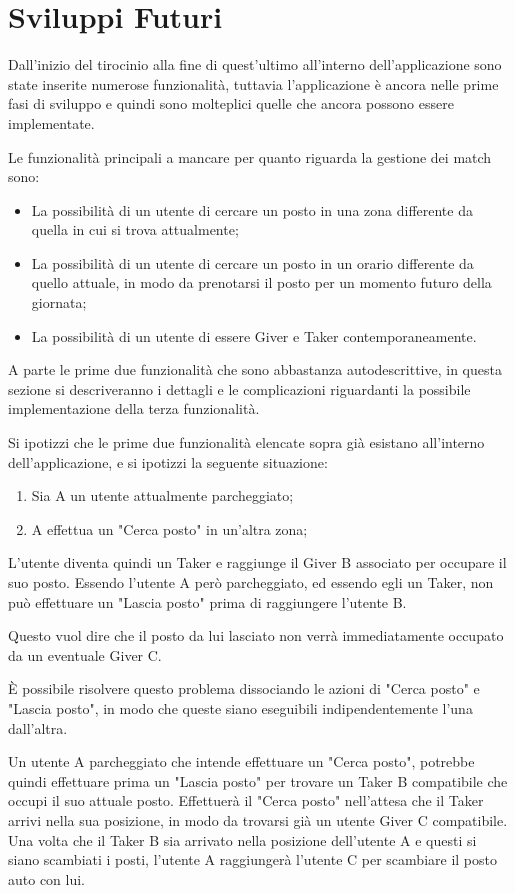 \pagebreak
\section{Sviluppi Futuri}
Dall'inizio del tirocinio alla fine di quest'ultimo all'interno dell'applicazione sono state inserite numerose funzionalità, tuttavia l'applicazione è ancora nelle prime fasi di sviluppo e quindi sono molteplici quelle che ancora possono essere implementate.

Le funzionalità principali a mancare per quanto riguarda la gestione dei match sono:
\begin{itemize}
    \item La possibilità di un utente di cercare un posto in una zona differente da quella in cui si trova attualmente;
    \item La possibilità di un utente di cercare un posto in un orario differente da quello attuale, in modo da prenotarsi il posto per un momento futuro della giornata;
    \item La possibilità di un utente di essere Giver e Taker contemporaneamente.
\end{itemize}

A parte le prime due funzionalità che sono abbastanza autodescrittive, in questa sezione si descriveranno i dettagli e le complicazioni riguardanti la possibile implementazione della terza funzionalità.

Si ipotizzi che le prime due funzionalità elencate sopra già esistano all'interno dell'applicazione, e si ipotizzi la seguente situazione:
\begin{enumerate}
    \item Sia A un utente attualmente parcheggiato;
    \item A effettua un "Cerca posto" in un'altra zona;
\end{enumerate}

L'utente diventa quindi un Taker e raggiunge il Giver B associato per occupare il suo posto. Essendo l'utente A però parcheggiato, ed essendo egli un Taker, non può effettuare un "Lascia posto" prima di raggiungere l'utente B. 

Questo vuol dire che il posto da lui lasciato non verrà immediatamente occupato da un eventuale Giver C.

È possibile risolvere questo problema dissociando le azioni di "Cerca posto" e "Lascia posto", in modo che queste siano eseguibili indipendentemente l'una dall'altra.

Un utente A parcheggiato che intende effettuare un "Cerca posto", potrebbe quindi effettuare prima un "Lascia posto" per trovare un Taker B compatibile che occupi il suo attuale posto.
Effettuerà il "Cerca posto" nell'attesa che il Taker arrivi nella sua posizione, in modo da trovarsi già un utente Giver C compatibile. Una volta che il Taker B sia arrivato nella posizione dell'utente A e questi si siano scambiati i posti, l'utente A raggiungerà l'utente C per scambiare il posto auto con lui.

